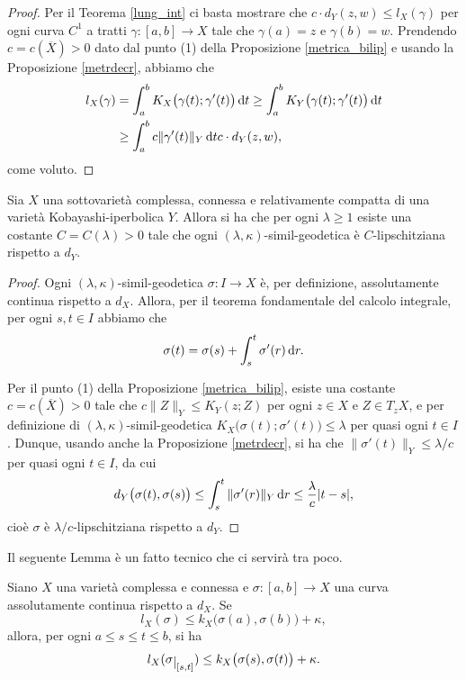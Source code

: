 \begin{proof}
    Per il Teorema \ref{lung_int} ci basta mostrare che $c\cdot d_Y(z,w) \le l_X(\gamma)$ per ogni curva $C^1$ a tratti $\gamma:[a,b] \longrightarrow X$ tale che $\gamma(a)=z$ e $\gamma(b)=w$. Prendendo $c=c(\overline{X})>0$ dato dal punto (1) della Proposizione \ref{metrica_bilip} e usando la Proposizione \ref{metrdecr}, abbiamo che
    \begin{align*}
        l_X(\gamma)&=\int_a^b K_X\big(\gamma(t);\gamma'(t)\big)\mathop{}\!\mathrm{d} t \ge \int_a^b K_Y\big(\gamma(t);\gamma'(t)\big)\mathop{}\!\mathrm{d} t\\
        &\ge \int_a^b c\|\gamma'(t)\|_Y\mathop{}\!\mathrm{d} t c\cdot d_Y(z,w),
    \end{align*}
    come voluto.
\end{proof}

\begin{prop} \label{simillip}
    Sia $X$ una sottovarietà complessa, connessa e relativamente compatta di una varietà Kobayashi-iperbolica $Y$. Allora si ha che per ogni $\lambda \ge 1$ esiste una costante $C=C(\lambda)>0$ tale che ogni $(\lambda,\kappa)$-simil-geodetica è $C$-lipschitziana rispetto a $d_Y$.
\end{prop}

\begin{proof}
    Ogni $(\lambda,\kappa)$-simil-geodetica $\sigma:I\longrightarrow X$ è, per definizione, assolutamente continua rispetto a $d_X$. Allora, per il teorema fondamentale del calcolo integrale, per ogni $s,t\in I$ abbiamo che
    $$\sigma(t)=\sigma(s)+\int_s^t\sigma'(r)\mathop{}\!\mathrm{d} r.$$
    
    Per il punto (1) della Proposizione \ref{metrica_bilip}, esiste una costante $c=c(\overline{X})>0$ tale che $c\|Z\|_Y \le K_Y(z;Z)$ per ogni $z\in X$ e $Z\in T_zX$, e per definizione di $(\lambda,\kappa)$-simil-geodetica $K_X\big(\sigma(t);\sigma'(t)\big) \le \lambda$ per quasi ogni $t\in I$. Dunque, usando anche la Proposizione \ref{metrdecr}, si ha che $\|\sigma'(t)\|_Y \le \lambda/c$ per quasi ogni $t\in I$, da cui
    $$d_Y\big(\sigma(t),\sigma(s)\big) \le \int_s^t\|\sigma'(r)\|_Y\mathop{}\!\mathrm{d} r \le \frac{\lambda}{c}|t-s|,$$
    cioè $\sigma$ è $\lambda/c$-lipschitziana rispetto a $d_Y$.
\end{proof}

Il seguente Lemma è un fatto tecnico che ci servirà tra poco.

\begin{lm} \label{restrdis}
    Siano $X$ una varietà complessa e connessa e $\sigma:[a,b] \longrightarrow X$ una curva assolutamente continua rispetto a $d_X$. Se
    $$l_X(\sigma) \le k_X\big(\sigma(a),\sigma(b)\big)+\kappa,$$
    allora, per ogni $a \le s \le t \le b$, si ha
    $$l_X(\sigma\restrict{[s,t]}) \le k_X\big(\sigma(s),\sigma(t)\big)+\kappa.$$
\end{lm}

